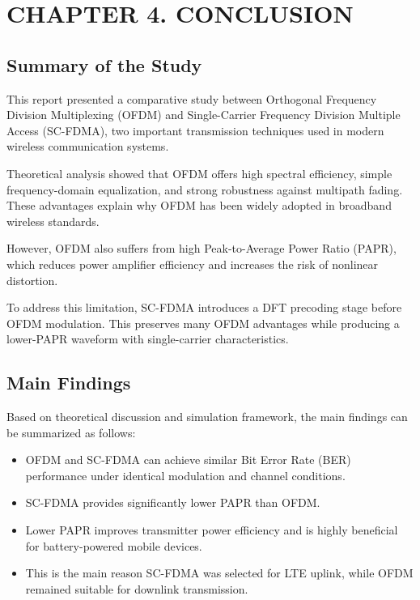 \section*{CHAPTER 4. CONCLUSION}

\setcounter{section}{4}
\setcounter{subsection}{0}
\setcounter{figure}{0}
\setcounter{table}{0}
\setcounter{equation}{0}

\subsection{Summary of the Study}

This report presented a comparative study between Orthogonal Frequency
Division Multiplexing (OFDM) and Single-Carrier Frequency Division
Multiple Access (SC-FDMA), two important transmission techniques used in
modern wireless communication systems.

Theoretical analysis showed that OFDM offers high spectral efficiency,
simple frequency-domain equalization, and strong robustness against
multipath fading. These advantages explain why OFDM has been widely
adopted in broadband wireless standards.

However, OFDM also suffers from high Peak-to-Average Power Ratio (PAPR),
which reduces power amplifier efficiency and increases the risk of
nonlinear distortion.

To address this limitation, SC-FDMA introduces a DFT precoding stage
before OFDM modulation. This preserves many OFDM advantages while
producing a lower-PAPR waveform with single-carrier characteristics.

\subsection{Main Findings}

Based on theoretical discussion and simulation framework, the main
findings can be summarized as follows:

\begin{itemize}
    \item OFDM and SC-FDMA can achieve similar Bit Error Rate (BER)
    performance under identical modulation and channel conditions.

    \item SC-FDMA provides significantly lower PAPR than OFDM.

    \item Lower PAPR improves transmitter power efficiency and is highly
    beneficial for battery-powered mobile devices.

    \item This is the main reason SC-FDMA was selected for LTE uplink,
    while OFDM remained suitable for downlink transmission.
\end{itemize}

